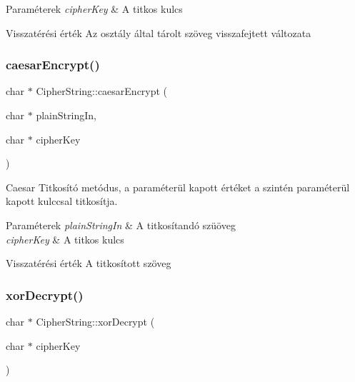 \begin{DoxyParams}{Paraméterek}
{\em cipher\+Key} & A titkos kulcs \\
\hline
\end{DoxyParams}
\begin{DoxyReturn}{Visszatérési érték}
Az osztály által tárolt szöveg visszafejtett változata 
\end{DoxyReturn}
\mbox{\label{class_cipher_string_ad697651cb43128c9f980a00f2fd31c69}} 
\subsubsection{\texorpdfstring{caesar\+Encrypt()}{caesarEncrypt()}}
{\footnotesize\ttfamily char $\ast$ Cipher\+String\+::caesar\+Encrypt (\begin{DoxyParamCaption}\item[{char $\ast$}]{plain\+String\+In,  }\item[{char $\ast$}]{cipher\+Key }\end{DoxyParamCaption})}

Caesar Titkosító metódus, a paraméterül kapott értéket a szintén paraméterül kapott kulccsal titkosítja.


\begin{DoxyParams}{Paraméterek}
{\em plain\+String\+In} & A titkosítandó szüöveg \\
\hline
{\em cipher\+Key} & A titkos kulcs \\
\hline
\end{DoxyParams}
\begin{DoxyReturn}{Visszatérési érték}
A titkosított szöveg 
\end{DoxyReturn}
\mbox{\label{class_cipher_string_a9d8689809d1e4e77867466e56335977d}} 
\subsubsection{\texorpdfstring{xor\+Decrypt()}{xorDecrypt()}}
{\footnotesize\ttfamily char $\ast$ Cipher\+String\+::xor\+Decrypt (\begin{DoxyParamCaption}\item[{char $\ast$}]{cipher\+Key }\end{DoxyParamCaption})}

